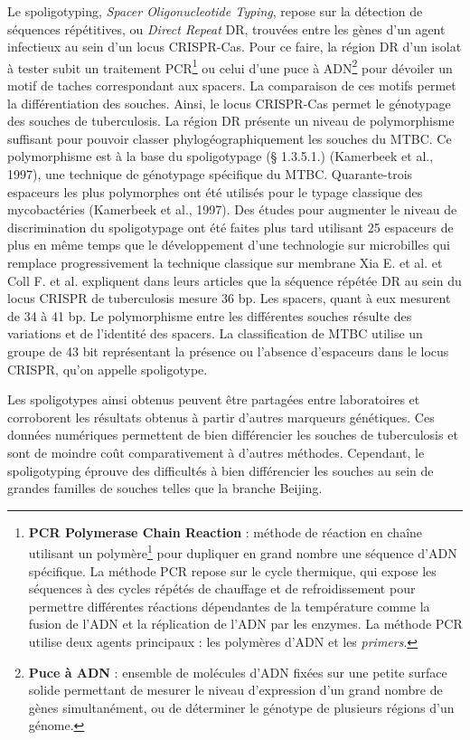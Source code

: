 \documentclass[twoside,a4paper,11pt,frenchb,openany]{report}
\begin{document}
Le spoligotyping, \textit{Spacer Oligonucleotide Typing}, repose sur la détection de séquences répétitives, ou \textit{Direct Repeat} DR, trouvées entre les gènes d'un agent infectieux au sein d'un locus CRISPR-Cas. Pour ce faire, la région DR d'un isolat à tester subit un traitement PCR\footnote{\textbf{PCR Polymerase Chain Reaction} : méthode de réaction en chaîne utilisant un polymère\footnote{\textbf{Polymère} : macromolécule répétant un même motif structural.} pour dupliquer en grand nombre une séquence d'ADN spécifique. La méthode PCR repose sur le cycle thermique, qui expose les séquences à des cycles répétés de chauffage et de refroidissement pour permettre différentes réactions dépendantes de la température comme la fusion de l'ADN et la réplication de l'ADN par les enzymes. La méthode PCR utilise deux agents principaux : les polymères d'ADN et les \textit{primers}.} ou celui d'une puce à ADN\footnote{\textbf{Puce à ADN} : ensemble de molécules d'ADN fixées sur une petite surface solide permettant de mesurer le niveau d'expression d'un grand nombre de gènes simultanément, ou de déterminer le génotype de plusieurs régions d'un génome.} pour dévoiler un motif de taches correspondant aux spacers. La comparaison de ces motifs permet la différentiation des souches. Ainsi, le locus CRISPR-Cas permet le génotypage des souches de tuberculosis.
La région DR présente un niveau de polymorphisme suffisant pour pouvoir classer phylogéographiquement les souches du MTBC. Ce polymorphisme est à la base du spoligotypage (§ 1.3.5.1.) (Kamerbeek et al., 1997), une technique de génotypage spécifique du MTBC. Quarante-trois espaceurs les plus polymorphes ont été utilisés pour le typage classique des mycobactéries (Kamerbeek et al., 1997). Des études pour augmenter le niveau de discrimination du spoligotypage ont été faites plus tard utilisant 25 espaceurs de plus en même temps que le développement d’une technologie sur microbilles qui remplace progressivement la technique classique sur membrane
Xia E. et al. et Coll F. et al. expliquent dans leurs articles \cite{xia, coll} que la séquence répétée DR au sein du locus CRISPR de tuberculosis mesure 36 bp. Les spacers, quant à eux mesurent de 34 à 41 bp. Le polymorphisme entre les différentes souches résulte des variations et de l'identité des spacers. La classification de MTBC utilise un groupe de 43 bit représentant la présence ou l'absence d'espaceurs dans le locus CRISPR, qu'on appelle spoligotype.

Les spoligotypes ainsi obtenus peuvent être partagées entre laboratoires et corroborent les résultats obtenus à partir d'autres marqueurs génétiques. Ces données numériques permettent de bien différencier les souches de tuberculosis et sont de moindre coût comparativement à d'autres méthodes. Cependant, le spoligotyping éprouve des difficultés à bien différencier les souches au sein de grandes familles de souches telles que la branche Beijing.
\end{document}
